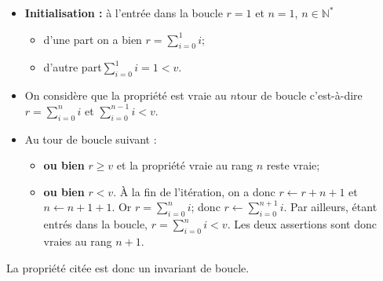 \begin{itemize}
\item \textbf{Initialisation : }à l'entrée dans la boucle $r=1$ et $n=1$, $n\in\mathbb{N}^*$
\begin{itemize}
\item d'une part  on a bien $r=\sum\limits_{i=0}^1 i$;
\item d'autre part$  \sum\limits_{i=0}^{1}i =1 < v$.
\end{itemize}
\item On considère que la propriété est vraie au $n$\ieme  tour de boucle c'est-à-dire $r=\sum\limits_{i=0}^n i$ et $\sum\limits_{i=0}^{n-1} i < v$.
\item Au tour de boucle suivant : 
\begin{itemize}
\item \textbf{ou bien} $r\geq v$ et la propriété vraie au rang $n$ reste vraie;
\item \textbf{ou bien} $r < v$. À la fin de l'itération, on a donc $r\leftarrow r+n+1 $ et $n\leftarrow n+1 +1$.
Or $r=\sum\limits_{i=0}^n i$; donc $r\leftarrow \sum\limits_{i=0}^{n+1} i$. Par ailleurs, étant entrés dans la boucle, 
$r=\sum\limits_{i=0}^n i < v$. Les deux assertions sont donc vraies au rang $n+1$. 
\end{itemize}
\end{itemize}
La propriété citée est donc un invariant de boucle. 
%

